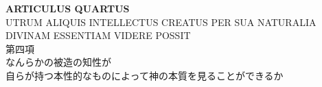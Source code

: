 \documentclass[paper=a4paper,fontsize=10pt,jafontsize=9pt,titlepage]{jlreq}
\begin{document}
\newpage
{}

 \begin{center}
  {\Large {\bfseries ARTICULUS QUARTUS}}\\
{\large UTRUM ALIQUIS INTELLECTUS CREATUS PER SUA NATURALIA\\
DIVINAM ESSENTIAM VIDERE POSSIT}\\
{\large 第四項\\なんらかの被造の知性が\\自らが持つ本性的なものによって神の本質を見ることができるか}
 \end{center}

{}
\setcounter{section}{4}
\setcounter{subsection}{0}
\end{document}
